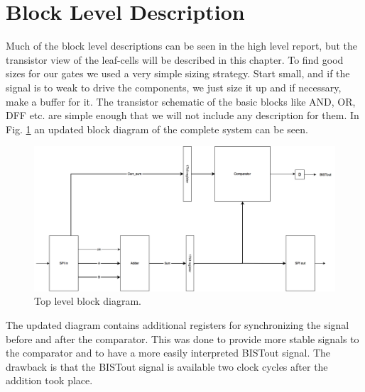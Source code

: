 \section{Block Level Description} \label{sec:block_level}
Much of the block level descriptions can be seen in the high level report, but the transistor view of the leaf-cells will be described in this chapter. To find good sizes for our gates we used a very simple sizing strategy. Start small, and if the signal is to weak to drive the components, we just size it up and if necessary, make a buffer for it. The transistor schematic of the basic blocks like AND, OR, DFF etc. are simple enough that we will not include any description for them. In Fig. \ref{top} an updated block diagram of the complete system can be seen.

\begin{figure}[H]
\centering
\captionsetup{justification=centering}
\includegraphics[scale=0.175]{../figures/top_level.png}
\caption{Top level block diagram.}
\label{top}
\end{figure}

\noindent The updated diagram contains additional registers for synchronizing the signal before and after the comparator. This was done to provide more stable signals to the comparator and to have a more easily interpreted BISTout signal. The drawback is that the BISTout signal is available two clock cycles after the addition took place.   
